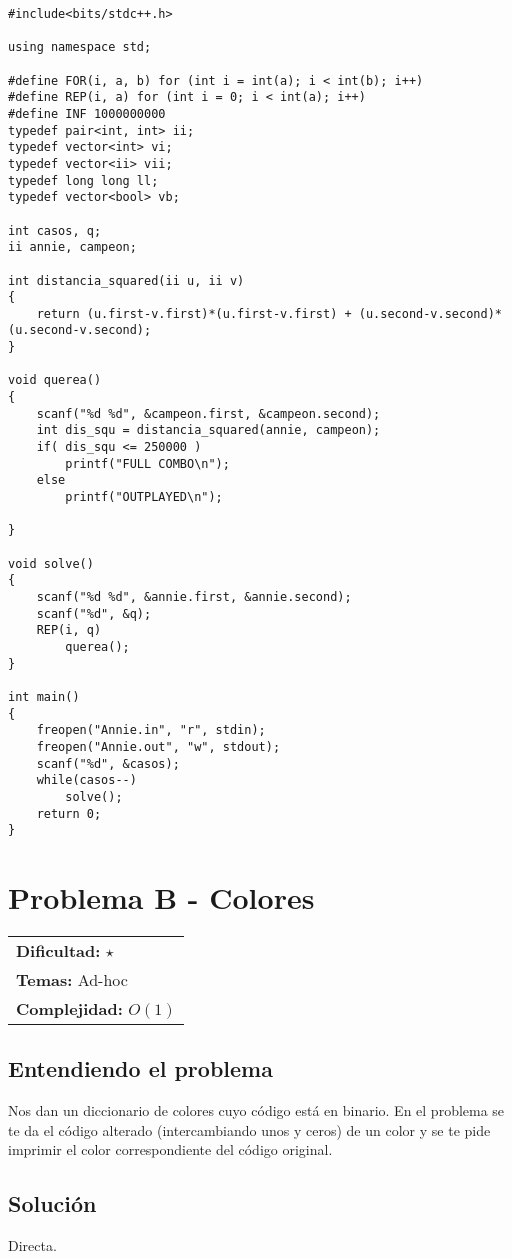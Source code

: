 \begin{verbatim}
#include<bits/stdc++.h>
 
using namespace std;
 
#define FOR(i, a, b) for (int i = int(a); i < int(b); i++)
#define REP(i, a) for (int i = 0; i < int(a); i++)
#define INF 1000000000
typedef pair<int, int> ii;
typedef vector<int> vi;
typedef vector<ii> vii;
typedef long long ll;
typedef vector<bool> vb;
 
int casos, q;
ii annie, campeon;
 
int distancia_squared(ii u, ii v)
{
    return (u.first-v.first)*(u.first-v.first) + (u.second-v.second)*(u.second-v.second);
}
 
void querea()
{
    scanf("%d %d", &campeon.first, &campeon.second);
    int dis_squ = distancia_squared(annie, campeon);
    if( dis_squ <= 250000 )
        printf("FULL COMBO\n");
    else
        printf("OUTPLAYED\n");
 
}
 
void solve()
{
    scanf("%d %d", &annie.first, &annie.second);
    scanf("%d", &q);
    REP(i, q)
        querea();
}
 
int main()
{
    freopen("Annie.in", "r", stdin);
    freopen("Annie.out", "w", stdout);
    scanf("%d", &casos);
    while(casos--)
        solve();
    return 0;
}
\end{verbatim}

\section{Problema B - Colores}

\hfill
\begin{tabular}{@{}l@{}}
\textbf{Dificultad:} $\star$ \\
\textbf{Temas:} Ad-hoc \\
\textbf{Complejidad:} $O(1)$
\end{tabular}

\subsection*{Entendiendo el problema}
Nos dan un diccionario de colores cuyo código está en binario. En el problema se te da el código alterado (intercambiando unos y ceros) de un color y se te pide imprimir el color correspondiente del código original.
\subsection*{Solución}
Directa.

